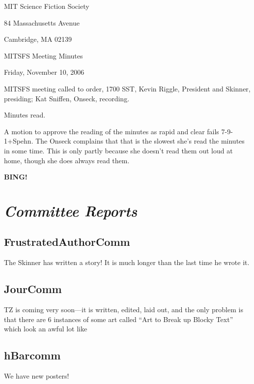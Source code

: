 \documentclass[10pt]{article}
\newcommand{\bing}{{\bf BING!} }
\newcommand{\goto}[1]{\bing \vskip 12pt \section*{{\em{#1}}}}
\begin{document}
\begin{center}

MIT Science Fiction Society

84 Massachusetts Avenue

Cambridge, MA 02139

\vspace{12pt}

MITSFS Meeting Minutes

Friday, November 10, 2006

\end{center}

\vspace{18pt}

\setlength{\parskip}{6pt}

\noindent
MITSFS meeting called to order, 1700 SST,
Kevin Riggle, President and Skinner, presiding; Kat Sniffen, Onseck, recording.

Minutes read.

A motion to approve the reading of the minutes as rapid and clear
fails 7-9-1+Spehn.  The Onseck complains that that is the slowest
she's read the minutes in some time. This is only partly because she
doesn't read them out loud at home, though she does always read them.


\goto{Committee Reports}



\subsection*{FrustratedAuthorComm}
The Skinner has written a story! It is much longer than the last time
he wrote it.

\subsection*{JourComm}
TZ is coming very soon---it is written, edited, laid out, and the only
problem is that there are 6 instances of some art called ``Art to
Break up Blocky Text'' which look an awful lot like 

\subsection*{hBarcomm}
We have new posters!
\end{document}
